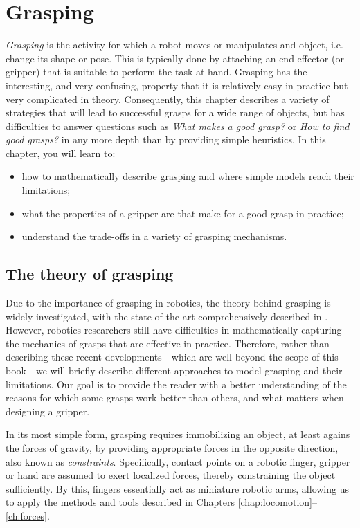 \chapter{Grasping}\label{chap:grasping}

\textsl{Grasping} is the activity for which a robot moves or manipulates and object, i.e. change its shape or pose. This is typically done by attaching an end-effector (or gripper) that is suitable to perform the task at hand.
Grasping has the interesting, and very confusing, property that it is relatively easy in practice but very complicated in theory. Consequently, this chapter describes a variety of strategies that will lead to successful grasps for a wide range of objects, but has difficulties to answer questions such as \textsl{What makes a good grasp?} or \textsl{How to find good grasps?} in any more depth than by providing simple heuristics.
In this chapter, you will learn to:
\begin{itemize}
\item how to mathematically describe grasping and where simple models reach their limitations;
\item what the properties of a gripper are that make for a good grasp in practice;
\item understand the trade-offs in a variety of grasping mechanisms.
\end{itemize}

\section{The theory of grasping}

Due to the importance of grasping in robotics, the theory behind grasping is widely investigated, with the state of the art comprehensively described in \cite{rimon2019mechanics}. However, robotics researchers still have difficulties in mathematically capturing the mechanics of grasps that are effective in practice. Therefore, rather than describing these recent developments---which are well beyond the scope of this book---we will briefly describe different approaches to model grasping and their limitations. Our goal is to provide the reader with a better understanding of the reasons for which some grasps work better than others, and what matters when designing a gripper.

In its most simple form, grasping requires immobilizing an object, at least agains the forces of gravity, by providing appropriate forces in the opposite direction, also known as \textsl{constraints}. Specifically, contact points on a robotic finger, gripper or hand are assumed to exert localized forces, thereby constraining the object sufficiently. By this, fingers essentially act as miniature robotic arms, allowing us to apply the methods and tools described in Chapters \ref{chap:locomotion}--\ref{ch:forces}.

